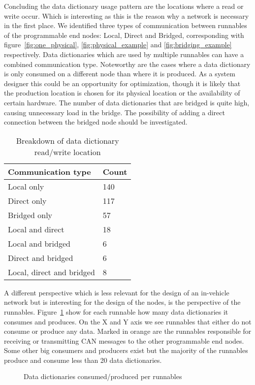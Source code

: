Concluding the data dictionary usage pattern are the locations where a read or write occur. Which is interesting as this is the reason why a network is necessary in the first place. We identified three types of communication between runnables of the programmable end nodes: Local, Direct and Bridged, corresponding with figure~\ref{fig:one_physical}, \ref{fig:physical_example} and \ref{fig:bridging_example} respectively. Data dictionaries which are used by multiple runnables can have a combined communication type. Noteworthy are the cases where a data dictionary is only consumed on a different node than where it is produced. As a system designer this could be an opportunity for optimization, though it is likely that the production location is chosen for its physical location or the availability of certain hardware. The number of data dictionaries that are bridged is quite high, causing unnecessary load in the bridge. The possibility of adding a direct connection between the bridged node should be investigated.

\begin{table}[htb]
    \centering
    \begin{tabular}{@{}ll@{}}
    \toprule
    Communication type        & Count \\ \midrule
    Local only                & 140   \\
    Direct only               & 117   \\
    Bridged only              & 57    \\
    Local and direct          & 18    \\
    Local and bridged         & 6     \\
    Direct and bridged        & 6     \\
    Local, direct and bridged & 8     \\ \bottomrule
    \end{tabular}
    \caption{Breakdown of data dictionary read/write location}
    \label{tab:dd_rw_location}
\end{table}

A different perspective which is less relevant for the design of an in-vehicle network but is interesting for the design of the nodes, is the perspective of the runnables. Figure~\ref{fig:produce_consume_runnable} show for each runnable how many data dictionaries it consumes and produces. On the X and Y axis we see runnables that either do not consume or produce any data. Marked in orange are the runnables responsible for receiving or transmitting CAN messages to the other programmable end nodes. Some other big consumers and producers exist but the majority of the runnables produce and consume less than 20 data dictionaries. 
\begin{figure}[htb]
    \centering
    
    \caption{Data dictionaries consumed/produced per runnables}
    \label{fig:produce_consume_runnable}
\end{figure}


